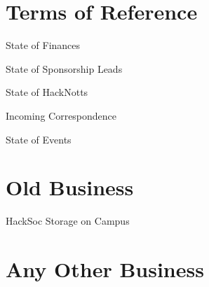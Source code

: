\documentclass[11pt,hacksoc,agenda]{meetingmins}
\begin{document}
\maketitle

\section{Terms of Reference}
\begin{items}
\item {State of Finances}
\item {State of Sponsorship Leads}
\item {State of HackNotts}
\item {Incoming Correspondence}
\item {State of Events}
\end{items}

\section{Old Business}
\begin{items}
\item HackSoc Storage on Campus
\end{items}


\section{Any Other Business}

\vspace{1em}
\end{document}
